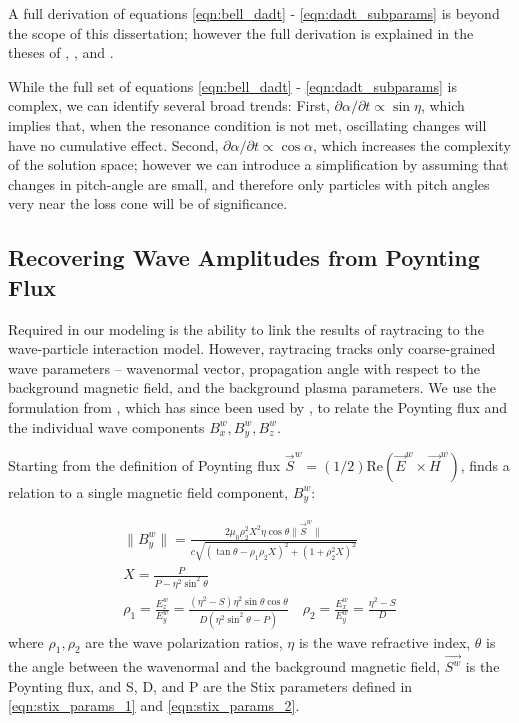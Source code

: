 A full derivation of equations \eqref{eqn:bell_dadt} - \eqref{eqn:dadt_subparams} is beyond the scope of this dissertation; however the full derivation is explained in the theses of \cite{Bortnik2005}, \cite{Ristic1993}, and \cite{Bell1984}.

While the full set of equations \eqref{eqn:bell_dadt} - \eqref{eqn:dadt_subparams} is complex, we can identify several broad trends: First, $\partial \alpha / \partial t \propto \sin \eta$, which implies that, when the resonance condition is not met, oscillating changes will have no cumulative effect. Second, $\partial \alpha / \partial t \propto \cos \alpha$, which increases the complexity of the solution space; however we can introduce a simplification by assuming that changes in pitch-angle are small, and therefore only particles with pitch angles very near the loss cone will be of significance. 

%

\subsection{Recovering Wave Amplitudes from Poynting Flux}
Required in our modeling is the ability to link the results of raytracing to the wave-particle interaction model. However, raytracing tracks only coarse-grained wave parameters -- wavenormal vector, propagation angle with respect to the background magnetic field, and the background plasma parameters. We use the formulation from \cite{Bell1984}, which has since been used by \cite{Ristic1993, Lauben1998, Bortnik2006}, to relate the Poynting flux and the individual wave components $B_x^w, B_y^w, B_z^w$.

Starting from the definition of Poynting flux $\vec{S}^w = (1/2) \mathrm{Re}(\vec{E}^w\times\vec{H}^w)$, \cite{Bell1984} finds a relation to a single magnetic field component, $B_y^w$:

\begin{gather}
\|B_y^w\| =  \frac{2\mu_0\rho_2^2 X^2 \eta \cos\theta \|\vec{S}^w\|}{c\sqrt{(\tan\theta - \rho_1 \rho_2 X)^2 + (1 + \rho_2^2 X)^2}} \\
X = \frac{P}{P - \eta^2\sin^2\theta} \\
\rho_1 = \frac{E_z^w}{E_y^w} = \frac{(\eta^2 - S) \eta^2 \sin\theta\cos\theta}{D (\eta^2 \sin^2 \theta - P)} \quad \rho_2 = \frac{E_x^w}{E_y^w} = \frac{\eta^2 - S}{D}
\end{gather}
\noindent where $\rho_1, \rho_2$ are the wave polarization ratios, $\eta$ is the wave refractive index, $\theta$ is the angle between the wavenormal and the background magnetic field, $\vec{S^w}$ is the Poynting flux, and S, D, and P are the Stix parameters defined in \eqref{eqn:stix_params_1} and \eqref{eqn:stix_params_2}.

